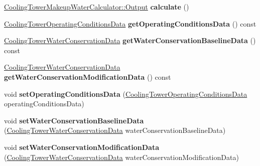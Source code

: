 \begin{DoxyCompactItemize}
\mbox{\label{class_cooling_tower_makeup_water_calculator_a13eda6b87d0ddbd49289b887c123e5b2}} 
\hyperlink{struct_cooling_tower_makeup_water_calculator_1_1_output}{Cooling\+Tower\+Makeup\+Water\+Calculator\+::\+Output} {\bfseries calculate} ()
\item 
\mbox{\label{class_cooling_tower_makeup_water_calculator_a6c64b1067a7ea2415f15313bcbc8188b}} 
\hyperlink{class_cooling_tower_operating_conditions_data}{Cooling\+Tower\+Operating\+Conditions\+Data} {\bfseries get\+Operating\+Conditions\+Data} () const
\item 
\mbox{\label{class_cooling_tower_makeup_water_calculator_ac130abbb8ec8f5b17a2b3696482b1a66}} 
\hyperlink{class_cooling_tower_water_conservation_data}{Cooling\+Tower\+Water\+Conservation\+Data} {\bfseries get\+Water\+Conservation\+Baseline\+Data} () const
\item 
\mbox{\label{class_cooling_tower_makeup_water_calculator_a4803b3f8e0ea3aa6ef31f686a48b35e7}} 
\hyperlink{class_cooling_tower_water_conservation_data}{Cooling\+Tower\+Water\+Conservation\+Data} {\bfseries get\+Water\+Conservation\+Modification\+Data} () const
\item 
\mbox{\label{class_cooling_tower_makeup_water_calculator_ab854c22dff3139c644399cfb34aba693}} 
void {\bfseries set\+Operating\+Conditions\+Data} (\hyperlink{class_cooling_tower_operating_conditions_data}{Cooling\+Tower\+Operating\+Conditions\+Data} operating\+Conditions\+Data)
\item 
\mbox{\label{class_cooling_tower_makeup_water_calculator_aad6f9b1a892dd62a95840dc18e1be48a}} 
void {\bfseries set\+Water\+Conservation\+Baseline\+Data} (\hyperlink{class_cooling_tower_water_conservation_data}{Cooling\+Tower\+Water\+Conservation\+Data} water\+Conservation\+Baseline\+Data)
\item 
\mbox{\label{class_cooling_tower_makeup_water_calculator_a3197dc0cd103c582e4b00fdf5790583a}} 
void {\bfseries set\+Water\+Conservation\+Modification\+Data} (\hyperlink{class_cooling_tower_water_conservation_data}{Cooling\+Tower\+Water\+Conservation\+Data} water\+Conservation\+Modification\+Data)
\end{DoxyCompactItemize}


